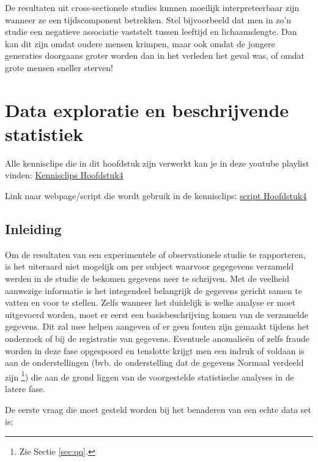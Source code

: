 \documentclass[
  12pt,dutch,coursenotes]{book}
\begin{document}
De resultaten uit cross-sectionele studies kunnen moeilijk interpreteerbaar zijn wanneer ze een tijdscomponent betrekken. Stel bijvoorbeeld dat men in zo'n studie een negatieve associatie
vaststelt tussen leeftijd en lichaamslengte. Dan kan dit zijn omdat oudere
mensen krimpen, maar ook omdat de jongere generaties doorgaans groter worden
dan in het verleden het geval was, of omdat grote mensen sneller sterven!

\hypertarget{chap-describe}{%
\chapter{Data exploratie en beschrijvende statistiek}\label{chap-describe}}

Alle kennisclips die in dit hoofdstuk zijn verwerkt kan je in deze youtube playlist vinden: \href{https://www.youtube.com/watch?v=AVd-8WE_DhU\&list=PLZH1hP8_LbJLKTeg_D9CHC3xbk0nfBa-1}{Kennisclips Hoofdstuk4}

Link naar webpage/script die wordt gebruik in de kennisclips: \href{https://statomics.github.io/sbc21/rmd/04-dataExploration.html}{script Hoofdstuk4}

\hypertarget{inleiding-3}{%
\section{Inleiding}\label{inleiding-3}}

Om de resultaten van een experimentele of observationele studie te
rapporteren, is het uiteraard niet mogelijk om per subject waarvoor gegegevens verzameld werden in de studie de bekomen gegevens neer te schrijven. Met
de veelheid aanwezige informatie is het integendeel belangrijk de gegevens
gericht samen te vatten en voor te stellen. Zelfs wanneer het duidelijk is welke analyse er moet uitgevoerd worden, moet er eerst een
basisbeschrijving komen van de verzamelde gegevens. Dit zal mee helpen
aangeven of er geen fouten zijn gemaakt tijdens het onderzoek of bij de
registratie van gegevens. Eventuele anomalieën of zelfs fraude worden in
deze fase opgespoord en tenslotte krijgt men een indruk of voldaan is aan de
onderstellingen (bvb. de onderstelling dat de gegevens Normaal verdeeld zijn
\footnote{Zie Sectie \ref{sec:qq}.}) die aan de grond liggen van de voorgestelde
statistische analyses in de latere fase.

De eerste vraag die moet gesteld worden bij het benaderen van een echte data
set is:
\end{document}
